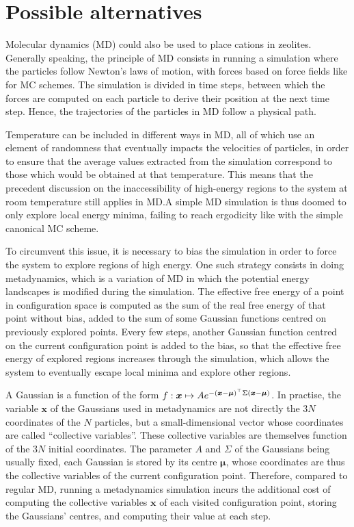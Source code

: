 \documentclass[main.tex]{subfiles}
\begin{document}
\section{Possible alternatives}

\label{metadynamics}

Molecular dynamics (MD) could also be used to place cations in zeolites. Generally speaking, the principle of MD consists in running a simulation where the particles follow Newton's laws of motion, with forces based on force fields like for MC schemes. The simulation is divided in time steps, between which the forces are computed on each particle to derive their position at the next time step. Hence, the trajectories of the particles in MD follow a physical path.

Temperature can be included in different ways in MD, all of which use an element of randomness that eventually impacts the velocities of particles, in order to ensure that the average values extracted from the simulation correspond to those which would be obtained at that temperature. This means that the precedent discussion on the inaccessibility of high-energy regions to the system at room temperature still applies in MD.\@ A simple MD simulation is thus doomed to only explore local energy minima, failing to reach ergodicity like with the simple canonical MC scheme.

To circumvent this issue, it is necessary to bias the simulation in order to force the system to explore regions of high energy. One such strategy consists in doing metadynamics\autocite{Metadynamics}, which is a variation of MD in which the potential energy landscapes is modified during the simulation. The effective free energy of a point in configuration space is computed as the sum of the real free energy of that point without bias, added to the sum of some Gaussian functions centred on previously explored points. Every few steps, another Gaussian function centred on the current configuration point is added to the bias, so that the effective free energy of explored regions increases through the simulation, which allows the system to eventually escape local minima and explore other regions.

A Gaussian is a function of the form $f:\boldsymbol x\mapsto Ae^{-\left(\boldsymbol x - \boldsymbol\mu\right)^\top\Sigma\left(\boldsymbol x - \boldsymbol\mu\right)}$. In practise, the variable $\boldsymbol x$ of the Gaussians used in metadynamics are not directly the $3N$ coordinates of the $N$ particles, but a small-dimensional vector whose coordinates are called ``collective variables''. These collective variables are themselves function of the $3N$ initial coordinates. The parameter $A$ and $\Sigma$ of the Gaussians being usually fixed, each Gaussian is stored by its centre $\boldsymbol\mu$, whose coordinates are thus the collective variables of the current configuration point. Therefore, compared to regular MD, running a metadynamics simulation incurs the additional cost of computing the collective variables $\boldsymbol x$ of each visited configuration point, storing the Gaussians' centres, and computing their value at each step.
\end{document}
